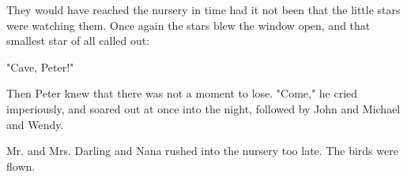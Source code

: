 They would have reached the nursery in time had it not been that the
little stars were watching them. Once again the stars blew the window
open, and that smallest star of all called out:


"Cave, Peter!"


Then Peter knew that there was not a moment to lose. "Come," he cried
imperiously, and soared out at once into the night, followed by John and
Michael and Wendy.


Mr. and Mrs. Darling and Nana rushed into the nursery too late. The birds
were flown.

